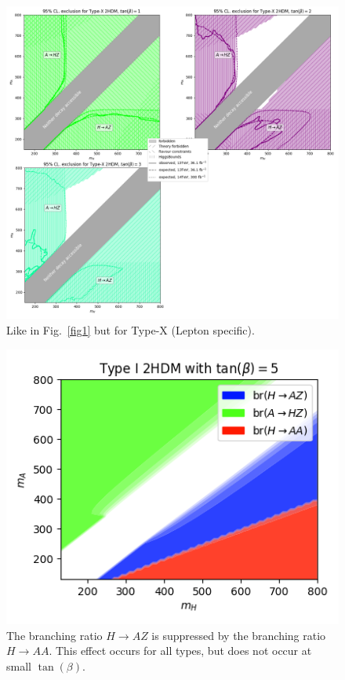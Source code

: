 \begin{figure}[t!]
	\centering
    \includegraphics[width=\textwidth]{single_tbs/type4.png}
    \caption{Like in Fig.~\ref{fig1} but for  Type-X (Lepton specific).}\label{fig4}
\end{figure}


\begin{figure}[t!]
	\centering
    \includegraphics[width=.5\textwidth]{branching_ratios_HAA.png}
    \caption{The branching ratio \(H\rightarrow AZ\) is suppressed by the branching ratio \(H\rightarrow AA\).
             This effect occurs for all types, but does not occur at small \(\tan(\beta)\).}\label{figsuppress}
\end{figure}


